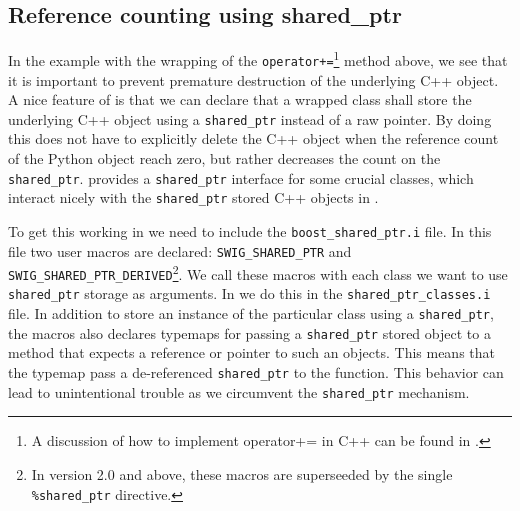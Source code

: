 \subsection{Reference counting using shared\_ptr}
In the example with the wrapping of the \texttt{operator+=}\footnote{A discussion of how to implement operator+= in C++ can be found in \cite{Mey97}.} method above, we see that it is important to prevent premature destruction of the underlying C++ object. A nice feature of \swig is that we can declare that a wrapped class shall store the underlying C++ object using a \texttt{shared\_ptr} instead of a raw pointer. By doing this \swig does not have to explicitly delete the C++ object when the reference count of the Python object reach zero, but rather decreases the count on the \texttt{shared\_ptr}. \dolfin provides a \texttt{shared\_ptr} interface for some crucial classes, which interact nicely with the \texttt{shared\_ptr} stored C++ objects in \dolfin. \par

To get this working in \pydolfin we need to include the \texttt{boost\_shared\_ptr.i} file. In this file two user macros are declared: \texttt{SWIG\_}\-\texttt{SHARED\_}\-\texttt{PTR} and \texttt{SWIG\_}\-\texttt{SHARED\_PTR\_}\-\texttt{DERIVED}\footnote{In \swig version 2.0 and above, these macros are superseeded by the single \texttt{\%shared\_ptr} directive.}. We call these macros with each class we want to use \texttt{shared\_ptr} storage as arguments. In \pydolfin we do this in the \texttt{shared\_ptr\_classes.i} file. In addition to store an instance of the particular class using a \texttt{shared\_ptr}, the macros also declares typemaps for passing a \texttt{shared\_ptr} stored object to a method that expects a reference or pointer to such an objects. This means that the typemap pass a de-referenced \texttt{shared\_ptr} to the function. This behavior can lead to unintentional trouble as we circumvent the \texttt{shared\_ptr} mechanism.\par

